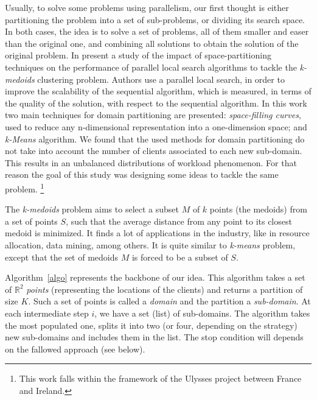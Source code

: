 
Usually, to solve some problems using parallelism, our first thought is either partitioning the problem into a set of sub-problems, or dividing its search space. In both cases, the idea is to solve a set of problems, all of them smaller and easer than the original one, and combining all solutions to obtain the solution of the original problem. In \cite{Arbelaez2012}  present a study of the impact of space-partitioning techniques on the performance of parallel local search algorithms to tackle the \textit{k-medoids} clustering problem. Authors use a parallel local search, in order to improve the scalability of the sequential algorithm, which is measured, in terms of the quality of the solution, with respect to the sequential algorithm. In this work two main techniques for domain partitioning are presented: {\it space-filling curves}, used to reduce any n-dimensional representation into a one-dimension space; and {\it k-Means} algorithm. We found that the used methods for domain partitioning do not take into account the number of clients associated to each new sub-domain. This results in an unbalanced distributions of workload phenomenon. For that reason the goal of this study was designing some ideas to tackle the same problem. \footnote{This work falls within the framework of the Ulysses project between France and Ireland.}

The \textit{k-medoids} problem aims to select a subset $M$ of $k$ points (the medoids) from a set of points $S$, such that the average distance from any point to its closest medoid is minimized. It finds a lot of applications in the industry, like in resource allocation, data mining, among others. It is quite similar to \textit{k-means} problem, except that the set of medoids $M$ is forced to be a subset of $S$.

Algorithm~\ref{algo} represents the backbone of our idea. This algorithm takes a set of $\mathbb{R}^2$ {\it points} (representing the locations of the clients) and returns a partition of size $K$. Such a set of points is called a {\it domain} and the partition a {\it sub-domain}. At each intermediate step $i$, we have a set (list) of sub-domains. The algorithm takes the most populated one, splits it into two (or four, depending on the strategy) new sub-domains and includes them in the list. The stop condition will depends on the fallowed approach (see below).

